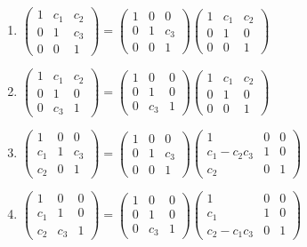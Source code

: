 \begin{enumerate}
  \item $\begin{pmatrix} 1 & c_1 & c_2 \\0 & 1 & c_3 \\0 & 0 & 1 \end{pmatrix}
    = \begin{pmatrix} 1 & 0 & 0 \\0 & 1 & c_3 \\0 & 0 & 1 \end{pmatrix}
    \begin{pmatrix} 1 & c_1 & c_2 \\0 & 1 & 0 \\0 & 0 & 1 \end{pmatrix}$
  \item $\begin{pmatrix} 1 & c_1 & c_2 \\0 & 1 & 0 \\0 & c_3 & 1 \end{pmatrix}
    = \begin{pmatrix} 1 & 0 & 0 \\0 & 1 & 0 \\0 & c_3 & 1 \end{pmatrix}
    \begin{pmatrix} 1 & c_1 & c_2 \\0 & 1 & 0 \\0 & 0 & 1 \end{pmatrix}$
  \item $\begin{pmatrix} 1 & 0 & 0 \\c_1 & 1 & c_3 \\c_2 & 0 & 1 \end{pmatrix}
    = \begin{pmatrix} 1 & 0 & 0 \\0 & 1 & c_3 \\0 & 0 & 1 \end{pmatrix}
    \begin{pmatrix} 1 & 0 & 0 \\c_1 -c_2c_3& 1 & 0 \\c_2 & 0 & 1 \end{pmatrix}$
  \item $\begin{pmatrix} 1 & 0 & 0 \\c_1 & 1 & 0 \\c_2 & c_3 & 1 \end{pmatrix}
    = \begin{pmatrix} 1 & 0 & 0 \\0 & 1 & 0 \\0 & c_3 & 1 \end{pmatrix}
    \begin{pmatrix} 1 & 0 & 0 \\c_1 & 1 & 0 \\c_2-c_1c_3 & 0 & 1 \end{pmatrix}$
\end{enumerate}


